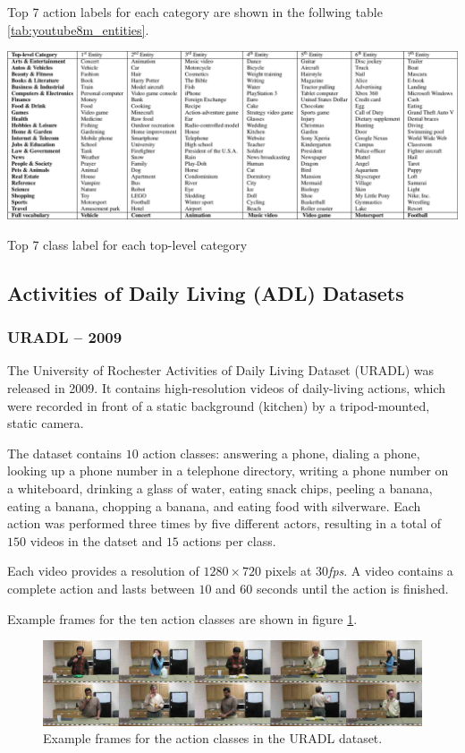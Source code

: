 Top 7 action labels for each category are shown in the follwing table \ref{tab:youtube8m_entities}.

\begin{table}[H]
    \centering
    \includegraphics[width=\textwidth]{img_datasets/youtube8m_entities}
    \caption{Top 7 class label for each top-level category \cite{abu-el-haija_youtube-8m:_2016}}
    \label{tab:youtube8m_entities}
\end{table}


\subsection{Activities of Daily Living (ADL) Datasets}

\subsubsection{URADL -- 2009}
The University of Rochester Activities of Daily Living Dataset (URADL) \cite{messing_activity_2009} was released in 2009.
It contains high-resolution videos of daily-living actions, which were recorded in front of a static background (kitchen) by a tripod-mounted, static camera.

The dataset contains $10$ action classes: answering a phone, dialing a phone, looking up a phone number in a telephone directory, writing a phone number on a whiteboard, drinking a glass of water, eating snack chips, peeling a banana, eating a banana, chopping a banana, and eating food with silverware.
Each action was performed three times by five different actors, resulting in a total of $150$ videos in the datset and $15$ actions per class.

Each video provides a resolution of $1280 \times 720$ pixels at $30$\textit{fps}.
A video contains a complete action and lasts between $10$ and $60$ seconds until the action is finished.

Example frames for the ten action classes are shown in figure \ref{fig:uradl_example}.
\begin{figure}[H]
    \centering
    \includegraphics[width=\textwidth]{img_datasets/uradl_example}
    \caption{Example frames for the action classes in the URADL dataset. \cite{_university_????}}
    \label{fig:uradl_example}
\end{figure}



